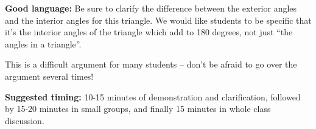 \documentclass[nooutcomes, noauthor]{ximera}
\begin{document}
\begin{instructorNotes}
{\bf Good language:} Be sure to clarify the difference between the exterior angles and the interior angles for this triangle. We would like students to be specific that it's the interior angles of the triangle which add to 180 degrees, not just ``the angles in a triangle''. 

This is a difficult argument for many students -- don't be afraid to go over the argument several times!



{\bf Suggested timing:} 10-15 minutes of demonstration and clarification, followed by 15-20 minutes in small groups, and finally 15 minutes in whole class discussion.


\end{instructorNotes}
\end{document}
